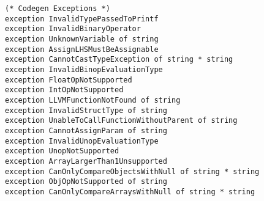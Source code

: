\begin{verbatim}
(* Codegen Exceptions *)
exception InvalidTypePassedToPrintf
exception InvalidBinaryOperator
exception UnknownVariable of string
exception AssignLHSMustBeAssignable
exception CannotCastTypeException of string * string
exception InvalidBinopEvaluationType
exception FloatOpNotSupported
exception IntOpNotSupported
exception LLVMFunctionNotFound of string
exception InvalidStructType of string
exception UnableToCallFunctionWithoutParent of string
exception CannotAssignParam of string
exception InvalidUnopEvaluationType
exception UnopNotSupported
exception ArrayLargerThan1Unsupported
exception CanOnlyCompareObjectsWithNull of string * string
exception ObjOpNotSupported of string
exception CanOnlyCompareArraysWithNull of string * string
\end{verbatim}	